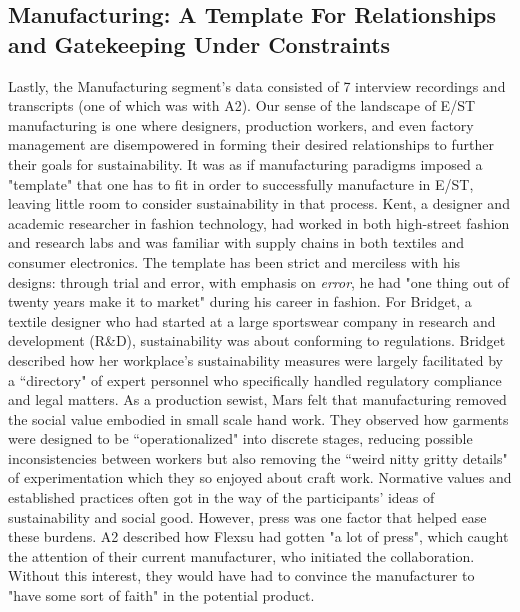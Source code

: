 \documentclass[manuscript,review,anonymous]{acmart}
\begin{document}
\subsection{Manufacturing: A Template For Relationships and Gatekeeping Under Constraints}
Lastly, the Manufacturing segment's data consisted of 7 interview recordings and transcripts (one of which was with A2). 
Our sense of the landscape of E/ST manufacturing is one where designers, production workers, and even factory management are disempowered in forming their desired relationships to further their goals for sustainability. It was as if manufacturing paradigms imposed a "template" that one has to fit in order to successfully manufacture in E/ST, leaving little room to consider sustainability in that process. Kent, a designer and academic researcher in fashion technology, had worked in both high-street fashion and research labs and was familiar with supply chains in both textiles and consumer electronics. The template has been strict and merciless with his designs: through trial and error, with emphasis on \textit{error}, he had "one thing out of twenty years make it to market" during his career in fashion. For Bridget, a textile designer who had started at a large sportswear company in research and development (R\&D), sustainability was about conforming to regulations. Bridget described how her workplace's sustainability measures were largely facilitated by a ``directory" of expert personnel who specifically handled regulatory compliance and legal matters. As a production sewist, Mars felt that manufacturing removed the social value embodied in small scale hand work. They observed how garments were designed to be ``operationalized" into discrete stages, reducing possible inconsistencies between workers but also removing the ``weird nitty gritty details" of experimentation which they so enjoyed about craft work. Normative values and established practices often got in the way of the participants' ideas of sustainability and social good.  However, press was one factor that helped ease these burdens. A2 described how Flexsu had gotten "a lot of press", which caught the attention of their current manufacturer, who initiated the collaboration. Without this interest, they would have had to convince the manufacturer to "have some sort of faith" in the potential product. 
\end{document}
